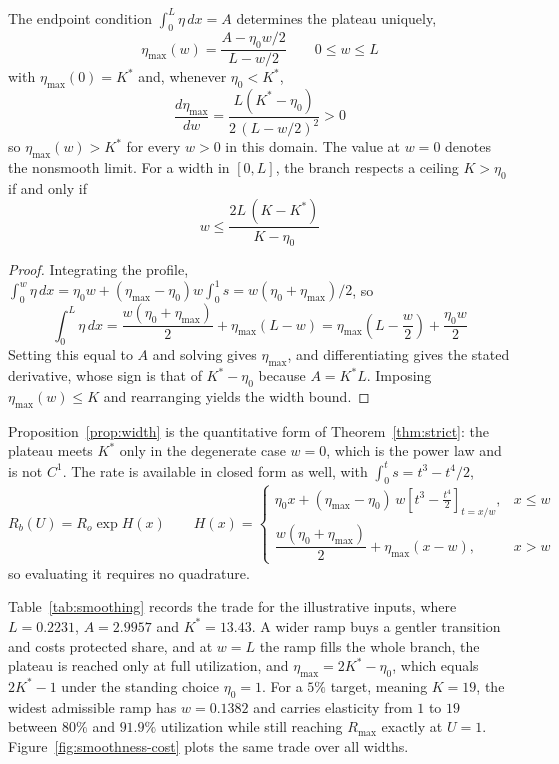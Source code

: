 \documentclass[11pt,a4paper]{article}
\begin{document}
\begin{proposition}
\label{prop:width}
The endpoint condition $\int_0^L\eta\,dx=A$ determines the plateau uniquely,
\begin{equation}
\boxed{
\eta_{\max}(w)=\frac{A-\eta_0w/2}{L-w/2}
\qquad 0\leq w\leq L
}
\end{equation}
with $\eta_{\max}(0)=K^*$ and, whenever $\eta_0<K^*$,
\begin{equation}
\frac{d\eta_{\max}}{dw}=\frac{L(K^*-\eta_0)}{2\,(L-w/2)^2}>0
\end{equation}
so $\eta_{\max}(w)>K^*$ for every $w>0$ in this domain. The value at $w=0$ denotes the nonsmooth limit. For a width in $[0,L]$, the branch respects a ceiling $K>\eta_0$ if and only if
\begin{equation}
\boxed{
w\leq\frac{2L\,(K-K^*)}{K-\eta_0}
}
\end{equation}
\end{proposition}
\begin{proof}
Integrating the profile, $\int_0^w\eta\,dx=\eta_0w+(\eta_{\max}-\eta_0)w\int_0^1s=w(\eta_0+\eta_{\max})/2$, so
\begin{equation}
\int_0^L\eta\,dx=\frac{w(\eta_0+\eta_{\max})}{2}+\eta_{\max}(L-w)=\eta_{\max}\left(L-\frac{w}{2}\right)+\frac{\eta_0w}{2}
\end{equation}
Setting this equal to $A$ and solving gives $\eta_{\max}$, and differentiating gives the stated derivative, whose sign is that of $K^*-\eta_0$ because $A=K^*L$. Imposing $\eta_{\max}(w)\leq K$ and rearranging yields the width bound.
\end{proof}

Proposition~\ref{prop:width} is the quantitative form of Theorem~\ref{thm:strict}: the plateau meets $K^*$ only in the degenerate case $w=0$, which is the power law and is not $C^1$. The rate is available in closed form as well, with $\int_0^t s=t^3-t^4/2$,
\begin{equation}
R_b(U)=R_o\exp H(x)
\qquad
H(x)=
\begin{cases}
\eta_0x+(\eta_{\max}-\eta_0)\,w\left[t^3-\tfrac{t^4}{2}\right]_{t=x/w}, & x\leq w\\[5pt]
\dfrac{w(\eta_0+\eta_{\max})}{2}+\eta_{\max}(x-w), & x>w
\end{cases}
\end{equation}
so evaluating it requires no quadrature.

Table~\ref{tab:smoothing} records the trade for the illustrative inputs, where $L=0.2231$, $A=2.9957$ and $K^*=13.43$. A wider ramp buys a gentler transition and costs protected share, and at $w=L$ the ramp fills the whole branch, the plateau is reached only at full utilization, and $\eta_{\max}=2K^*-\eta_0$, which equals $2K^*-1$ under the standing choice $\eta_0=1$. For a $5\%$ target, meaning $K=19$, the widest admissible ramp has $w=0.1382$ and carries elasticity from $1$ to $19$ between $80\%$ and $91.9\%$ utilization while still reaching $R_{\max}$ exactly at $U=1$. Figure~\ref{fig:smoothness-cost} plots the same trade over all widths.
\end{document}
